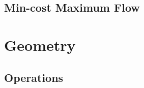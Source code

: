\documentclass[10pt,landscape,a4paper,twocolumn]{article}
\begin{document}
%

%

\subsection{Min-cost Maximum Flow}



\section{Geometry}

\subsection{Operations}



%

%

\begin{comment}
ê²©ìì ìŒë¡ êµ¬ì±ë simple polygonìŽ ì£ŒìŽì§. $i$ë polygon ëŽë¶ì ê²©ìì  ì, $b$ë polygon ì ë¶ ì ê²©ìì  ì, $A$ë polygonì ëìŽëŒê³  í  ë, ë€ìê³Œ ê°ì ììŽ ì±ëŠœíë€.

$A = i + \frac{b}{2} - 1$
\end{comment}
\end{document}

